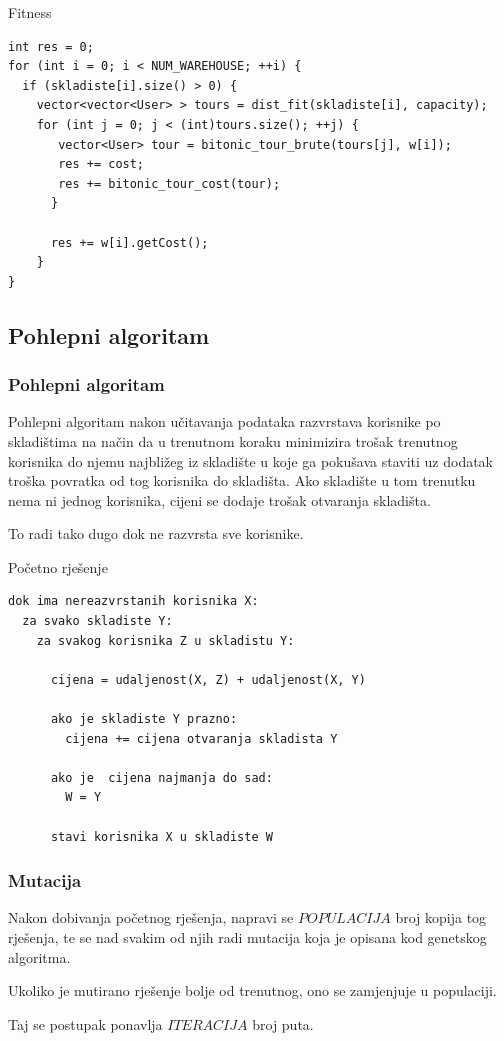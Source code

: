 \documentclass[utf8]{beamer}
\begin{document}
\begin{frame}[fragile]{Fitness}
\begin{lstlisting}
int res = 0;
for (int i = 0; i < NUM_WAREHOUSE; ++i) {
  if (skladiste[i].size() > 0) {
    vector<vector<User> > tours = dist_fit(skladiste[i], capacity);
    for (int j = 0; j < (int)tours.size(); ++j) {
       vector<User> tour = bitonic_tour_brute(tours[j], w[i]);
       res += cost;
       res += bitonic_tour_cost(tour);
      }
        
      res += w[i].getCost();
    }
}
\end{lstlisting}
\end{frame}

\subsection{Pohlepni algoritam}
\begin{frame}
\frametitle{Pohlepni algoritam}

Pohlepni algoritam nakon učitavanja podataka razvrstava korisnike po skladištima na način da u trenutnom koraku minimizira trošak trenutnog korisnika do njemu najbližeg iz skladište u koje ga pokušava staviti uz dodatak troška povratka od tog korisnika do skladišta. Ako skladište u tom trenutku nema ni jednog korisnika, cijeni se dodaje trošak otvaranja skladišta.

\vspace{5mm}

To radi tako dugo dok ne razvrsta sve korisnike.

\end{frame}

\begin{frame}[fragile]{Početno rješenje}
\begin{lstlisting}
dok ima nereazvrstanih korisnika X:
  za svako skladiste Y:
    za svakog korisnika Z u skladistu Y:	
		
      cijena = udaljenost(X, Z) + udaljenost(X, Y)
			
      ako je skladiste Y prazno:
        cijena += cijena otvaranja skladista Y
		
      ako je  cijena najmanja do sad:
        W = Y
	
      stavi korisnika X u skladiste W
\end{lstlisting}
\end{frame}

\begin{frame}
\frametitle{Mutacija}

Nakon dobivanja početnog rješenja, napravi se $POPULACIJA$ broj kopija tog rješenja, te se nad svakim od njih radi mutacija koja je opisana kod genetskog algoritma.

\vspace{5mm}

Ukoliko je mutirano rješenje bolje od trenutnog, ono se zamjenjuje u populaciji.

\vspace{5mm}

Taj se postupak ponavlja $ITERACIJA$ broj puta.

\end{frame}
\end{document}
